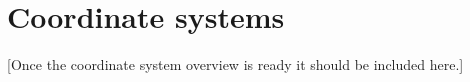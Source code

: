 \chapter{Coordinate systems}
\label{ch:coordinates}

[Once the coordinate system overview is ready it should be included here.]
